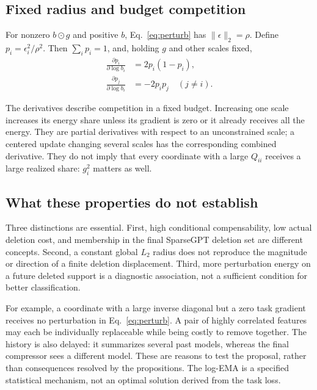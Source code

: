 \subsection{Fixed radius and budget competition}
\begin{proposition}
\label{prop:budget}
For nonzero $b\odot g$ and positive $b$, Eq.~\eqref{eq:perturb} has $\|\epsilon\|_2=\rho$. Define $p_i=\epsilon_i^2/\rho^2$. Then $\sum_i p_i=1$, and, holding $g$ and other scales fixed,
\begin{align}
 \frac{\partial p_i}{\partial\log b_i}&=2p_i(1-p_i),\\
 \frac{\partial p_j}{\partial\log b_i}&=-2p_ip_j\quad(j\ne i).
\end{align}
\end{proposition}
The derivatives describe competition in a fixed budget. Increasing one scale increases its energy share unless its gradient is zero or it already receives all the energy. They are partial derivatives with respect to an unconstrained scale; a centered update changing several scales has the corresponding combined derivative. They do not imply that every coordinate with a large $Q_{ii}$ receives a large realized share: $g_i^2$ matters as well.

\subsection{What these properties do not establish}
Three distinctions are essential. First, high conditional compensability, low actual deletion cost, and membership in the final SparseGPT deletion set are different concepts. Second, a constant global $L_2$ radius does not reproduce the magnitude or direction of a finite deletion displacement. Third, more perturbation energy on a future deleted support is a diagnostic association, not a sufficient condition for better classification.

For example, a coordinate with a large inverse diagonal but a zero task gradient receives no perturbation in Eq.~\eqref{eq:perturb}. A pair of highly correlated features may each be individually replaceable while being costly to remove together. The history is also delayed: it summarizes several past models, whereas the final compressor sees a different model. These are reasons to test the proposal, rather than consequences resolved by the propositions. The log-EMA is a specified statistical mechanism, not an optimal solution derived from the task loss.
